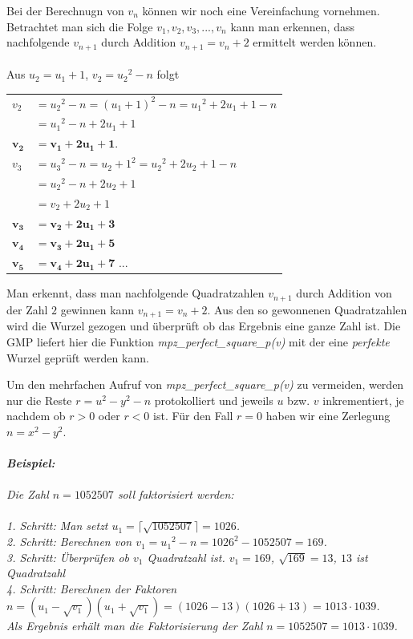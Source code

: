 \documentclass[a4paper,11pt]{article}
\begin{document}
Bei der Berechnugn von $v_n$ können wir noch eine Vereinfachung vornehmen.
Betrachtet man sich die Folge $v_1, v_2 , v_3 , ..., v_n$ kann man erkennen,
dass nachfolgende $v_{n+1}$ durch Addition $v_{n+1} = v_n+2$ ermittelt werden können.\\\\
Aus $u_2 = u_1 + 1$, $v_2 = {u_2}^2 - n$ folgt\\
\begin{center}
\begin{tabular}{ll}
$v_2$ & $= {u_2}^2 - n = (u_1 + 1)^2 - n = {u_1}^2 + 2u_1 + 1 - n$\\
      &	$= {u_1}^2 - n + 2u_1 +1$\\
$\mathbf{v_2}$ & $\mathbf{= v_1 + 2u_1 + 1}$.\\

$v_3$ & $= {u_3}^2 - n = {u_2 +1}^2 = {u_2}^2 + 2u_2 + 1 - n$\\
	& $= {u_2}^2 - n + 2u_2 + 1$\\
	& $= v_2 + 2u_2 +1$\\
$\mathbf{v_3}$	& $\mathbf{= v_2 + 2u_1 +3}$\\
 $\mathbf{v_4}$	& $\mathbf{ = v_3 + 2u_1 + 5}$\\
 $\mathbf{v_5}$	& $\mathbf{ = v_4 + 2u_1 + 7}$ ...\\
\end{tabular}
\end{center}

Man erkennt, dass man nachfolgende Quadratzahlen $v_{n+1}$ durch Addition
von der Zahl $2$ gewinnen kann $v_{n+1} = v_n + 2$. Aus den so gewonnenen Quadratzahlen
wird die Wurzel gezogen und überprüft ob das Ergebnis eine ganze Zahl ist.
Die GMP liefert hier die Funktion \textit{mpz\_perfect\_square\_p(v)} mit der
eine \textit{perfekte} Wurzel geprüft werden kann.

Um den mehrfachen Aufruf von \textit{mpz\_perfect\_square\_p(v)} zu vermeiden,
werden nur die Reste $r = u^2 - y^2 - n$ protokolliert und jeweils $u$ bzw.
$v$ inkrementiert, je nachdem ob $r>0$ oder $r<0$ ist. Für den Fall $r = 0$
haben wir eine Zerlegung $n = x^2 - y^2$.\\\\
{\it
\textbf{Beispiel:}\\\\
Die Zahl $n = 1052507$ soll faktorisiert werden:\\\\
1. Schritt: Man setzt $u_1 = \lceil\sqrt{1052507}\rceil = 1026$.\\
2. Schritt: Berechnen von  $v_1 = {u_1}^2 - n = 1026^2 - 1052507 = 169$.\\
3. Schritt: Überprüfen ob $v_1$ Quadratzahl ist.
	$v_1 = 169$, $\sqrt{169} = 13$, $13$ ist Quadratzahl \\
4. Schritt: Berechnen der Faktoren
$n = (u_1 - \sqrt{v_1})(u_1 + \sqrt{v_1}) = (1026 - 13)(1026 + 13) = 1013\cdot1039$.\\
Als Ergebnis erhält man die Faktorisierung der Zahl $n=1052507=1013\cdot1039$.\\\\
}
\end{document}
